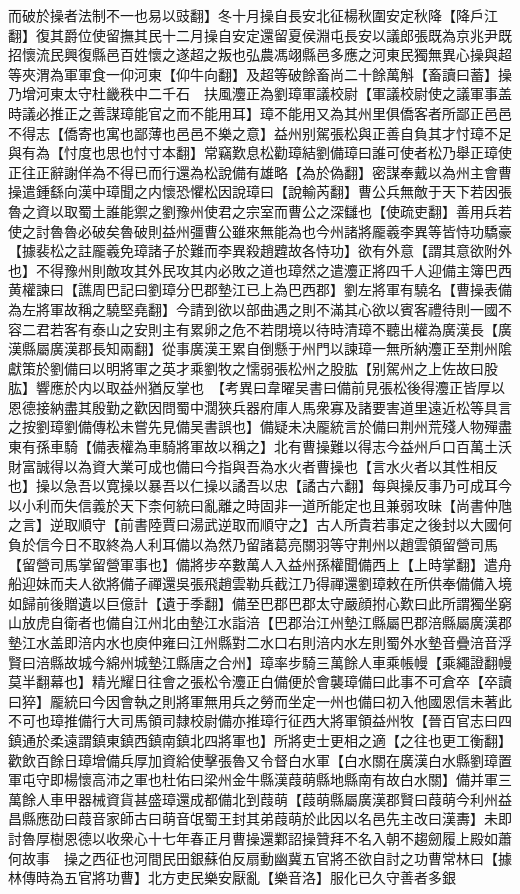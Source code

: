 而破於操者法制不一也易以豉翻】冬十月操自長安北征楊秋圍安定秋降【降戶江翻】復其爵位使留撫其民十二月操自安定還留夏侯淵屯長安以議郎張既為京兆尹既招懷流民興復縣邑百姓懷之遂超之叛也弘農馮翊縣邑多應之河東民獨無異心操與超等夾渭為軍軍食一仰河東【仰牛向翻】及超等破餘畜尚二十餘萬斛【畜讀曰蓄】操乃增河東太守杜畿秩中二千石　扶風灋正為劉璋軍議校尉【軍議校尉使之議軍事盖時議必推正之善謀璋能官之而不能用耳】璋不能用又為其州里俱僑客者所鄙正邑邑不得志【僑寄也寓也鄙薄也邑邑不樂之意】益州别駕張松與正善自負其才忖璋不足與有為【忖度也思也忖寸本翻】常竊歎息松勸璋結劉備璋曰誰可使者松乃舉正璋使正往正辭謝佯為不得已而行還為松說備有雄略【為於偽翻】密謀奉戴以為州主會曹操遣鍾繇向漢中璋聞之内懷恐懼松因說璋曰【說輸芮翻】曹公兵無敵于天下若因張魯之資以取蜀土誰能禦之劉豫州使君之宗室而曹公之深讎也【使疏吏翻】善用兵若使之討魯魯必破矣魯破則益州彊曹公雖來無能為也今州諸將龎羲李異等皆恃功驕豪【據裴松之註龎羲免璋諸子於難而李異殺趙韙故各恃功】欲有外意【謂其意欲附外也】不得豫州則敵攻其外民攻其内必敗之道也璋然之遣灋正將四千人迎備主簿巴西黄權諫曰【譙周巴記曰劉璋分巴郡墊江已上為巴西郡】劉左將軍有驍名【曹操表備為左將軍故稱之驍堅堯翻】今請到欲以部曲遇之則不滿其心欲以賓客禮待則一國不容二君若客有泰山之安則主有累卵之危不若閉境以待時清璋不聽出權為廣漢長【廣漢縣屬廣漢郡長知兩翻】從事廣漢王累自倒懸于州門以諫璋一無所納灋正至荆州隂獻策於劉備曰以明將軍之英才乘劉牧之懦弱張松州之股肱【别駕州之上佐故曰股肱】響應於内以取益州猶反掌也　【考異曰韋曜吴書曰備前見張松後得灋正皆厚以恩德接納盡其殷勤之歡因問蜀中濶狹兵器府庫人馬衆寡及諸要害道里遠近松等具言之按劉璋劉備傳松未嘗先見備吴書誤也】備疑未决龎統言於備曰荆州荒殘人物殫盡東有孫車騎【備表權為車騎將軍故以稱之】北有曹操難以得志今益州戶口百萬土沃財富誠得以為資大業可成也備曰今指與吾為水火者曹操也【言水火者以其性相反也】操以急吾以寛操以暴吾以仁操以譎吾以忠【譎古六翻】每與操反事乃可成耳今以小利而失信義於天下柰何統曰亂離之時固非一道所能定也且兼弱攻昧【尚書仲虺之言】逆取順守【前書陸賈曰湯武逆取而順守之】古人所貴若事定之後封以大國何負於信今日不取終為人利耳備以為然乃留諸葛亮關羽等守荆州以趙雲領留營司馬【留營司馬掌留營軍事也】備將步卒數萬人入益州孫權聞備西上【上時掌翻】遣舟船迎妹而夫人欲將備子禪還吳張飛趙雲勒兵截江乃得禪還劉璋敕在所供奉備備入境如歸前後贈遺以巨億計【遺于季翻】備至巴郡巴郡太守嚴顔拊心歎曰此所謂獨坐窮山放虎自衛者也備自江州北由墊江水詣涪【巴郡治江州墊江縣屬巴郡涪縣屬廣漢郡墊江水盖即涪内水也庾仲雍曰江州縣對二水口右則涪内水左則蜀外水墊音疊涪音浮賢曰涪縣故城今綿州城墊江縣唐之合州】璋率步騎三萬餘人車乘帳幔【乘繩證翻幔莫半翻幕也】精光耀日往會之張松令灋正白備便於會襲璋備曰此事不可倉卒【卒讀曰猝】龎統曰今因會執之則將軍無用兵之勞而坐定一州也備曰初入他國恩信未著此不可也璋推備行大司馬領司隸校尉備亦推璋行征西大將軍領益州牧【晉百官志曰四鎮通於柔遠謂鎮東鎮西鎮南鎮北四將軍也】所將吏士更相之適【之往也更工衡翻】歡飲百餘日璋增備兵厚加資給使擊張魯又令督白水軍【白水關在廣漢白水縣劉璋置軍屯守即楊懷高沛之軍也杜佑曰梁州金牛縣漢葭萌縣地縣南有故白水關】備并軍三萬餘人車甲器械資貨甚盛璋還成都備北到葭萌【葭萌縣屬廣漢郡賢曰葭萌今利州益昌縣應劭曰葭音家師古曰萌音氓蜀王封其弟葭萌於此因以名邑先主改曰漢夀】未即討魯厚樹恩德以收衆心十七年春正月曹操還鄴詔操贊拜不名入朝不趨劒履上殿如蕭何故事　操之西征也河間民田銀蘇伯反扇動幽冀五官將丕欲自討之功曹常林曰【據林傳時為五官將功曹】北方吏民樂安厭亂【樂音洛】服化已久守善者多銀